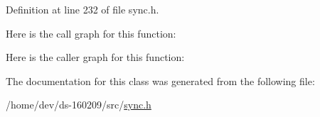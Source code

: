 Definition at line 232 of file sync.\+h.



Here is the call graph for this function\+:




Here is the caller graph for this function\+:




The documentation for this class was generated from the following file\+:\begin{DoxyCompactItemize}
\item 
/home/dev/ds-\/160209/src/\hyperlink{sync_8h}{sync.\+h}\end{DoxyCompactItemize}
